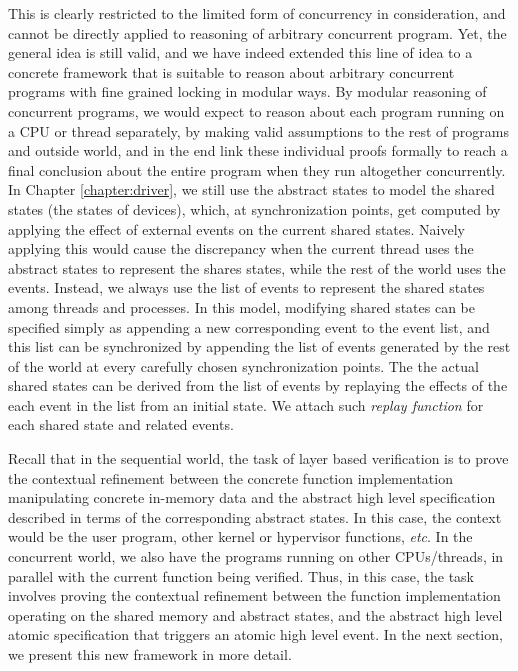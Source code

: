 This is clearly restricted to the limited form of concurrency in consideration,
and cannot be directly applied to reasoning of arbitrary concurrent program.
Yet, the general idea is still valid, and we have indeed extended this line of
idea to a concrete framework that is suitable to reason about arbitrary
concurrent programs with fine grained locking in modular ways.
By modular reasoning of concurrent programs, we would expect to reason about
each program running on a CPU or thread separately, by making valid assumptions
to the rest of programs and outside world, and in the end link these individual
proofs formally to reach a final conclusion about the entire program when they
run altogether concurrently. 
In Chapter \ref{chapter:driver}, we still use the abstract states
to model the shared states (the states of devices), which, at synchronization
points, get computed by applying the effect of external events on the current
shared states. Naively applying this would cause the discrepancy when the current
thread uses the abstract states to represent the shares states, while the rest
of the world uses the events. Instead, we always use the list of events to represent
the shared states among threads and processes. In this model, modifying shared
states can be specified simply as appending a new corresponding event to the
event list, and this list can be synchronized by appending the list of events
generated by the rest of the world at every carefully chosen synchronization points.
The the actual shared states can be derived from the list of events by replaying
the effects of the each event in the list from an initial state. We attach such
\emph{replay function} for each shared state and related events.

Recall that in the sequential world, the task of layer based verification is to prove
the contextual refinement between the concrete function implementation manipulating
concrete in-memory data and the abstract high level specification described in
terms of the corresponding abstract states. In this case, the context would be the
user program, other kernel or hypervisor functions, {\it etc}.
In the concurrent world, we also have the programs running on other CPUs/threads,
in parallel with the current function being verified.
Thus, in this case, the task involves proving the contextual refinement between
the function implementation operating on the shared memory and abstract states,
and the abstract high level atomic specification that triggers an atomic high level
event. In the next section, we present this new framework in more detail.

